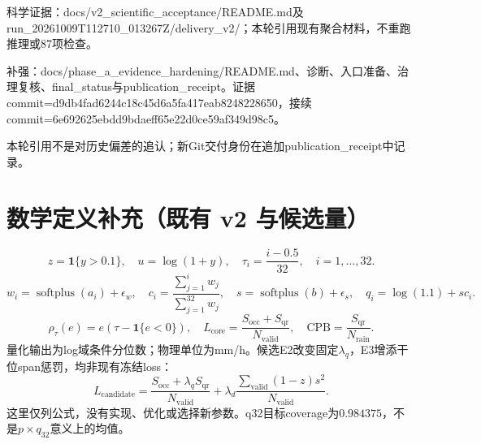 \documentclass[UTF8,fontset=fandol,10pt]{ctexart}
\begin{document}
科学证据：docs/\allowbreak{}v2\_\allowbreak{}scientific\_\allowbreak{}acceptance/\allowbreak{}README.md及run\_\allowbreak{}20261009T112710\_\allowbreak{}013267Z/\allowbreak{}delivery\_\allowbreak{}v2/\allowbreak{}；本轮引用现有聚合材料，不重跑推理或87项检查。

补强：docs/\allowbreak{}phase\_\allowbreak{}a\_\allowbreak{}evidence\_\allowbreak{}hardening/\allowbreak{}README.md、诊断、入口准备、治理复核、final\_\allowbreak{}status与publication\_\allowbreak{}receipt。证据commit=d9db4fad6244\allowbreak{}c18c45d6a5fa\allowbreak{}417eab824822\allowbreak{}8650，接续commit=6e692625ebdd\allowbreak{}9bdaeff65e22\allowbreak{}d0ce59af349d\allowbreak{}98c5。

本轮引用不是对历史偏差的追认；新Git交付身份在追加publication\_\allowbreak{}receipt中记录。\clearpage\section{数学定义补充（既有 v2 与候选量）}
\[
z=\mathbf{1}\{y>0.1\},\quad u=\log(1+y),\quad
\tau_i=\frac{i-0.5}{32},\quad i=1,\ldots,32.
\]
\[
w_i=\operatorname{softplus}(a_i)+\epsilon_w,\quad
c_i=\frac{\sum_{j=1}^{i}w_j}{\sum_{j=1}^{32}w_j},\quad
s=\operatorname{softplus}(b)+\epsilon_s,\quad q_i=\log(1.1)+s c_i.
\]
\[
\rho_\tau(e)=e(\tau-\mathbf{1}\{e<0\}),\quad
L_{\mathrm{core}}=\frac{S_{\mathrm{occ}}+S_{\mathrm{qr}}}{N_{\mathrm{valid}}},\quad
\mathrm{CPB}=\frac{S_{\mathrm{qr}}}{N_{\mathrm{rain}}}.
\]
量化输出为log域条件分位数；物理单位为mm/h。候选E2改变固定\(\lambda_q\)，E3增添干位span惩罚，均非现有冻结loss：
\[
L_{\mathrm{candidate}}=\frac{S_{\mathrm{occ}}+\lambda_q S_{\mathrm{qr}}}{N_{\mathrm{valid}}}
+\lambda_d\frac{\sum_{\mathrm{valid}}(1-z)s^2}{N_{\mathrm{valid}}}.
\]
这里仅列公式，没有实现、优化或选择新参数。q32目标coverage为\(0.984375\)，不是\(p\times q_{32}\)意义上的均值。
\end{document}
